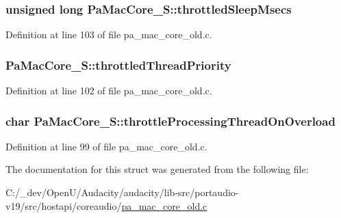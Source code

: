 \subsubsection[{\texorpdfstring{throttled\+Sleep\+Msecs}{throttledSleepMsecs}}]{\setlength{\rightskip}{0pt plus 5cm}unsigned long Pa\+Mac\+Core\+\_\+\+S\+::throttled\+Sleep\+Msecs}\hypertarget{struct_pa_mac_core___s_a7ed3c3e0fc7065594886b8c437413aeb}{}\label{struct_pa_mac_core___s_a7ed3c3e0fc7065594886b8c437413aeb}


Definition at line 103 of file pa\+\_\+mac\+\_\+core\+\_\+old.\+c.

\subsubsection[{\texorpdfstring{throttled\+Thread\+Priority}{throttledThreadPriority}}]{ Pa\+Mac\+Core\+\_\+\+S\+::throttled\+Thread\+Priority}\hypertarget{struct_pa_mac_core___s_a4b601ed5926d694e987501f2663a3dbd}{}\label{struct_pa_mac_core___s_a4b601ed5926d694e987501f2663a3dbd}


Definition at line 102 of file pa\+\_\+mac\+\_\+core\+\_\+old.\+c.

\subsubsection[{\texorpdfstring{throttle\+Processing\+Thread\+On\+Overload}{throttleProcessingThreadOnOverload}}]{\setlength{\rightskip}{0pt plus 5cm}char Pa\+Mac\+Core\+\_\+\+S\+::throttle\+Processing\+Thread\+On\+Overload}\hypertarget{struct_pa_mac_core___s_a5929bd4e98ff26136a693b6435c697ba}{}\label{struct_pa_mac_core___s_a5929bd4e98ff26136a693b6435c697ba}


Definition at line 99 of file pa\+\_\+mac\+\_\+core\+\_\+old.\+c.



The documentation for this struct was generated from the following file\+:\begin{DoxyCompactItemize}
\item 
C\+:/\+\_\+dev/\+Open\+U/\+Audacity/audacity/lib-\/src/portaudio-\/v19/src/hostapi/coreaudio/\hyperlink{pa__mac__core__old_8c}{pa\+\_\+mac\+\_\+core\+\_\+old.\+c}\end{DoxyCompactItemize}

